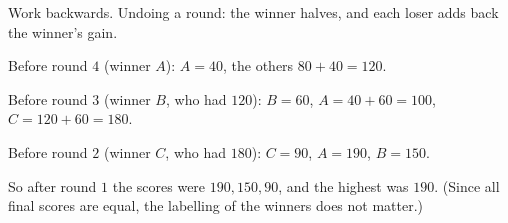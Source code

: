 Work backwards. Undoing a round: the winner halves, and each loser adds back the winner's gain.

Before round $4$ (winner $A$): $A=40$, the others $80+40=120$.

Before round $3$ (winner $B$, who had $120$): $B=60$, $A=40+60=100$, $C=120+60=180$.

Before round $2$ (winner $C$, who had $180$): $C=90$, $A=190$, $B=150$.

So after round $1$ the scores were $190,150,90$, and the highest was $\boxed{190}$. (Since all final scores are equal, the labelling of the winners does not matter.)
